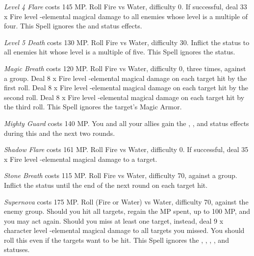 \begin{multicols}{2}
    \textit{Level 4 Flare} costs 145 MP\@. Roll Fire vs Water, difficulty 0. If successful, deal 33 x Fire level -elemental magical damage to all enemies whose level is a multiple of four. This Spell ignores the  and  status effects.
    
    \textit{Level 5 Death} costs 130 MP\@. Roll Fire vs Water, difficulty 30. Inflict the  status to all enemies hit whose level is a multiple of five. This Spell ignores the  status.
    
    \textit{Magic Breath} costs 120 MP\@. Roll Fire vs Water, difficulty 0, three times, against a group. Deal 8 x Fire level -elemental magical damage on each target hit by the first roll. Deal 8 x Fire level -elemental magical damage on each target hit by the second roll. Deal 8 x Fire level -elemental magical damage on each target hit by the third roll. This Spell ignores the target’s Magic Armor.
    
    \textit{Mighty Guard} costs 140 MP\@. You and all your allies gain the , , and  status effects during this and the next two rounds.
    
    \textit{Shadow Flare} costs 161 MP\@. Roll Fire vs Water, difficulty 0. If successful, deal 35 x Fire level -elemental magical damage to a target.
    
    \textit{Stone Breath} costs 115 MP\@. Roll Fire vs Water, difficulty 70, against a group. Inflict the  status until the end of the next round on each target hit.
    
	\textit{Supernova} costs 175 MP\@. Roll (Fire or Water) vs Water, difficulty 70, against the enemy group. Should you hit all targets, regain the MP spent, up to 100 MP, and you may act again. Should you miss at least one target, instead, deal 9 x character level -elemental magical damage to all targets you missed. You should roll this even if the targets want to be hit. This Spell ignores the , , , ,  and  statuses.

\end{multicols}
